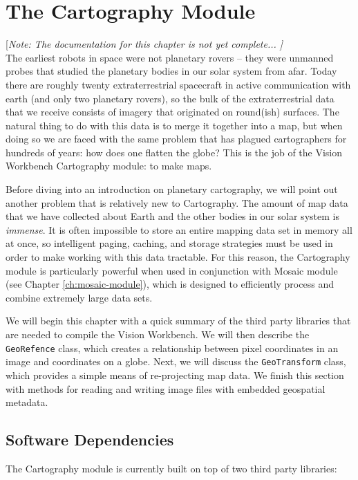 \chapter{The Cartography Module}\label{ch:cartography-module}

[{\em Note: The documentation for this chapter is not yet complete... ]}
$$
$$ 
The earliest robots in space were not planetary rovers -- they were
unmanned probes that studied the planetary bodies in our solar system
from afar.  Today there are roughly twenty extraterrestrial spacecraft
in active communication with earth (and only two planetary rovers), so
the bulk of the extraterrestrial data that we receive consists of
imagery that originated on round(ish) surfaces.  The natural thing to
do with this data is to merge it together into a map, but when doing
so we are faced with the same problem that has plagued cartographers
for hundreds of years: how does one flatten the globe?  This is the job
of the Vision Workbench Cartography module: to make maps.

Before diving into an introduction on planetary cartography, we will
point out another problem that is relatively new to Cartography.  The
amount of map data that we have collected about Earth and the other
bodies in our solar system is {\em immense}.  It is often impossible
to store an entire mapping data set in memory all at once, so
intelligent paging, caching, and storage strategies must be used in
order to make working with this data tractable.  For this reason, the
Cartography module is particularly powerful when used in conjunction
with Mosaic module (see Chapter \ref{ch:mosaic-module}), which is
designed to efficiently process and combine extremely large data sets.

We will begin this chapter with a quick summary of the third party
libraries that are needed to compile the Vision Workbench.  We will
then describe the \verb#GeoRefence# class, which creates a
relationship between pixel coordinates in an image and coordinates on
a globe.  Next, we will discuss the \verb#GeoTransform# class, which
provides a simple means of re-projecting map data.  We finish this
section with methods for reading and writing image files with embedded
geospatial metadata.

\section{Software Dependencies}

The Cartography module is currently built on top of two third party
libraries:

